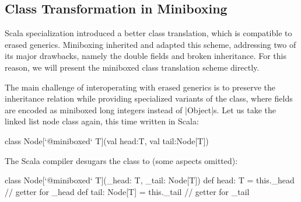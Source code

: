 %
%
%
%

\subsection{Class Transformation in Miniboxing}

Scala specialization \cite{iuli-thesis, specialization-iuli} introduced a better class translation, which is compatible to erased generics. Miniboxing \cite{miniboxing} inherited and adapted this scheme, addressing two of its major drawbacks, namely the double fields and broken inheritance. For this reason, we will present the miniboxed class translation scheme directly.

The main challenge of interoperating with erased generics is to preserve the inheritance relation while providing specialized variants of the class, where fields are encoded as miniboxed long integers instead of |Object|s. Let us take the linked list node class again, this time written in Scala:

\begin{lstlisting-nobreak}
 class Node[`@miniboxed` T](val head:T, val tail:Node[T])
\end{lstlisting-nobreak}

The Scala compiler desugars the class to (some aspects omitted):

\begin{lstlisting-nobreak}
 class Node[`@miniboxed` T](_head: T, _tail: Node[T]) {
   def head: T = this._head                 // getter for _head
   def tail: Node[T] = this._tail // getter for _tail
 }
\end{lstlisting-nobreak}


